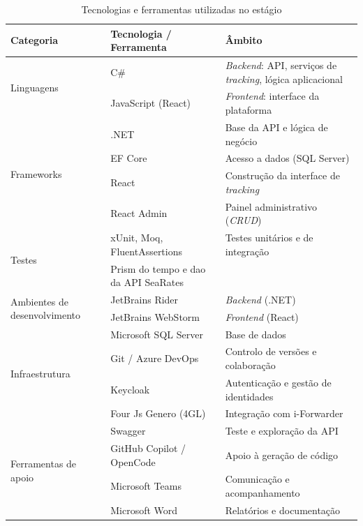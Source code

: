 \documentclass[a4paper,12pt]{report}
\begin{document}
\begin{table}[H]
\centering
\caption{Tecnologias e ferramentas utilizadas no estágio}
\label{tab:tecnologias}
\small
\begin{tabular}{@{}p{} p{} p{}@{}}
\toprule
\textbf{Categoria} & \textbf{Tecnologia / Ferramenta} & \textbf{Âmbito} \\
\midrule
\multirow{2}{=}{Linguagens}
  & C\# & \textit{Backend}: API, serviços de \textit{tracking}, lógica aplicacional \\
  & JavaScript (React) & \textit{Frontend}: interface da plataforma \\
\midrule
\multirow{4}{=}{Frameworks}
  & .NET \cite{dotnet} & Base da API e lógica de negócio \\
  & EF Core \cite{efcore} & Acesso a dados (SQL Server) \\
  & React \cite{react} & Construção da interface de \textit{tracking} \\
  & React Admin \cite{reactadmin} & Painel administrativo (\textit{CRUD}) \\
\midrule
\multirow{2}{=}{Testes}
  & xUnit, Moq, FluentAssertions \cite{xunit,moq,fluentassertions} & Testes unitários e de integração \\
  & Prism \cite{prism} do tempo e dao da API SeaRates \\
\midrule
\multirow{2}{=}{Ambientes de desenvolvimento}
  & JetBrains Rider \cite{rider} & \textit{Backend} (.NET) \\
  & JetBrains WebStorm \cite{webstorm} & \textit{Frontend} (React) \\
\midrule
\multirow{4}{=}{Infraestrutura}
  & Microsoft SQL Server \cite{sqlserver} & Base de dados \\
  & Git / Azure DevOps \cite{azuredevops} & Controlo de versões e colaboração \\
  & Keycloak \cite{keycloak} & Autenticação e gestão de identidades \\
  & Four Js Genero (4GL) \cite{fourjs} & Integração com i-Forwarder \\
\midrule
\multirow{4}{=}{Ferramentas de apoio}
  & Swagger \cite{swagger} & Teste e exploração da API \\
  & GitHub Copilot \cite{copilot} / OpenCode & Apoio à geração de código \\
  & Microsoft Teams & Comunicação e acompanhamento \\
  & Microsoft Word & Relatórios e documentação \\
\bottomrule
\end{tabular}
\end{table}
\end{document}
